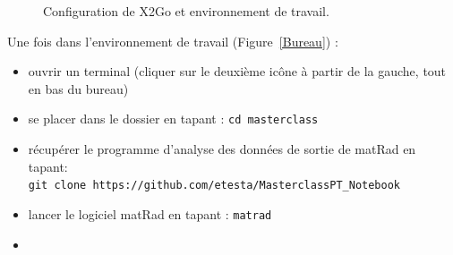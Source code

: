 \documentclass[a4paper,12pt,notitlepage]{article}	%
\begin{document}
\begin{figure}[!htp]
  \centering
  \caption{Configuration de X2Go et environnement de travail.}
\end{figure} 	

Une fois dans l'environnement de travail (Figure~\ref{Bureau}) :
\begin{itemize}
	\item ouvrir un terminal (cliquer sur le deuxième icône à partir de la gauche, tout en bas du bureau)
	\item se placer dans le dossier  en tapant : \texttt{cd masterclass}
	\item récupérer le programme d'analyse des données de sortie de matRad en tapant: \\ \texttt{git clone https://github.com/etesta/MasterclassPT\_Notebook}
	\item lancer le logiciel matRad en tapant : \texttt{matrad}
	\item {}
\end{itemize}
\end{document}
